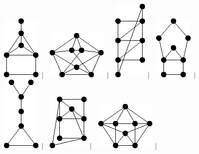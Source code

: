 \documentclass[11pt,paper=b5,footinclude,headinclude]{scrbook} %
\newtheorem{ex}{Vaja\hypertarget{sol:\theex}}[chapter]
\begin{document}
\begin{ex}
\begin{figure}
\includegraphics[scale=0.5]{smallGraphs/g_co-X107.png}$\,\mid\,$\
\includegraphics[scale=0.5]{smallGraphs/g_co-X111.png}$\,\mid\,$\
\includegraphics[scale=0.5]{smallGraphs/g_co-X115.png}$\,\mid\,$\
\includegraphics[scale=0.5]{smallGraphs/g_co-X117.png}$\,\mid\,$\
\includegraphics[scale=0.5]{smallGraphs/g_co-X12.png}$\,\mid\,$\
\includegraphics[scale=0.5]{smallGraphs/g_co-X120.png}$\,\mid\,$\
\includegraphics[scale=0.5]{smallGraphs/g_co-X126.png}$\,\mid\,$\

\end{figure}
\end{ex}
\end{document}
